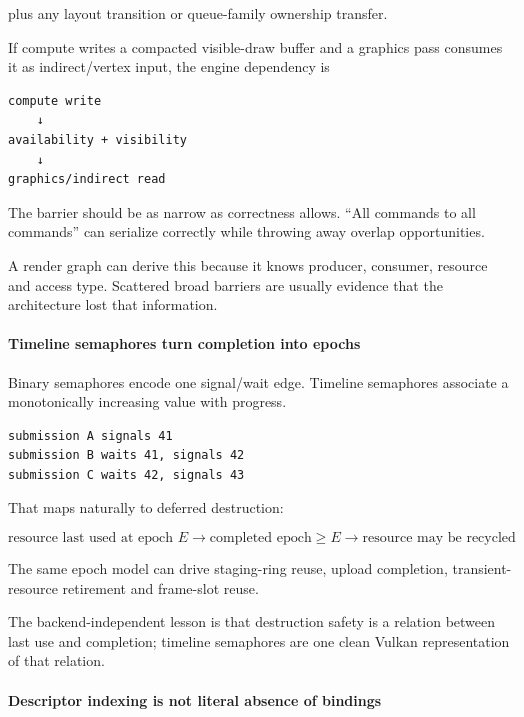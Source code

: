 plus any layout transition or queue-family ownership transfer.

If compute writes a compacted visible-draw buffer and a graphics pass consumes it as indirect/vertex input, the engine dependency is

\begin{verbatim}
compute write
    ↓
availability + visibility
    ↓
graphics/indirect read
\end{verbatim}

The barrier should be as narrow as correctness allows. ``All commands to all commands'' can serialize correctly while throwing away overlap opportunities.

A render graph can derive this because it knows producer, consumer, resource and access type. Scattered broad barriers are usually evidence that the architecture lost that information.

\paragraph{Timeline semaphores turn completion into epochs}\label{timeline-semaphores-turn-completion-into-epochs}

Binary semaphores encode one signal/wait edge. Timeline semaphores associate a monotonically increasing value with progress.

\begin{verbatim}
submission A signals 41
submission B waits 41, signals 42
submission C waits 42, signals 43
\end{verbatim}

That maps naturally to deferred destruction:

\[
\boxed{
\text{resource last used at epoch }E
\rightarrow
\text{completed epoch}\ge E
\rightarrow
\text{resource may be recycled}
}
\]

The same epoch model can drive staging-ring reuse, upload completion, transient-resource retirement and frame-slot reuse.

The backend-independent lesson is that destruction safety is a relation between last use and completion; timeline semaphores are one clean Vulkan representation of that relation.

\paragraph{Descriptor indexing is not literal absence of bindings}\label{descriptor-indexing-is-not-literal-absence-of-bindings}

